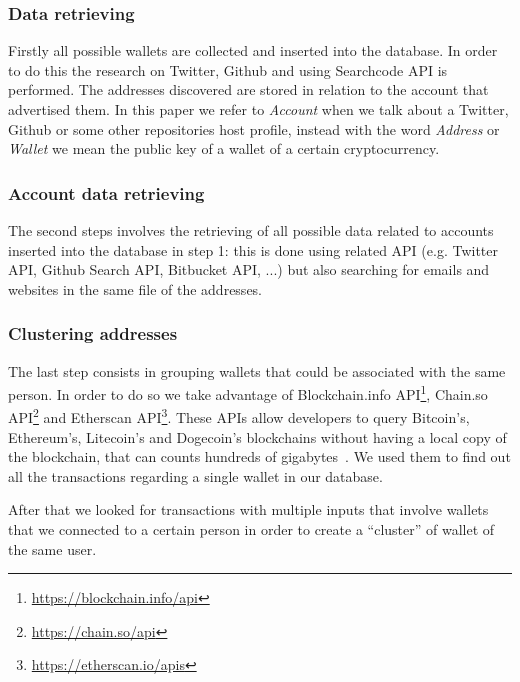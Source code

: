 \subsubsection*{Data retrieving} Firstly all possible wallets are collected
and inserted into the database. In order to do this the research on
Twitter, Github and using Searchcode API is performed. The addresses
discovered are stored in relation to the account that advertised them.
In this paper we refer to \textit{Account} when we talk about a Twitter, Github
or some other repositories host profile, instead with the word \textit{Address}
or \textit{Wallet} we mean the public key of a wallet of a certain
cryptocurrency.
\subsubsection*{Account data retrieving} The second steps involves the
retrieving of all possible data related to accounts inserted into the database
in step 1: this is done using related API (e.g. Twitter API, Github Search API,
Bitbucket API, ...) but also searching for emails and websites in the same file
of the addresses.
\subsubsection*{Clustering addresses} The last step consists in grouping 
wallets that could be associated with the same person. In order to do so we
take advantage of
Blockchain.info API\footnote{\url{https://blockchain.info/api}},
Chain.so API\footnote{\url{https://chain.so/api}} and
Etherscan API\footnote{\url{https://etherscan.io/apis}}. These APIs allow
developers to query Bitcoin's, Ethereum's, Litecoin's and Dogecoin's blockchains without
having a local copy of the blockchain, that can counts hundreds of
gigabytes~\cite{bib:bitinfochart}. We used them to find out all the transactions
regarding a single wallet in our database.

After that we looked for transactions with multiple inputs that
involve wallets that we connected to a certain person in order to create a
``cluster'' of wallet of the same user.
